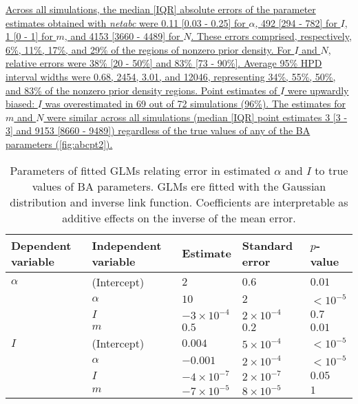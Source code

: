 \documentclass[12pt]{article}\usepackage[]{graphicx}\usepackage[]{color}
\let\mref\cref
\renewcommand{\cref}[1]{\mbox{\mref{#1}}}
\newcommand{\add}[1]{\color{blue} \uline{#1} \color{black}}
\begin{document}
\add{Across all simulations, the median [IQR] absolute errors of the parameter 
estimates obtained with \textit{netabc} were
    0.11 
    [0.03 - 
    0.25]
for $\alpha$,
    492 
    [294 - 
    782]
for $I$,
    1 
    [0 - 
    1]
for $m$, and
    4153 
    [3660 - 
    4489]
for $N$. These errors comprised, respectively,
    6\%,
    11\%,
    17\%, and
    29\%
of the regions of nonzero prior density. For $I$ and $N$, relative errors were
    38\%
    [20 - 
    50\%]
and
    83\%
    [73 - 
    90\%].
Average 95\% HPD interval widths were
    0.68,
    2454,
    3.01, and
    12046,
representing 
    34\%,
    55\%,
    50\%, and
    83\%
of the nonzero prior density regions. Point estimates of $I$ were upwardly
biased: $I$ was overestimated in
    69
out of 
    72
simulations
    (96\%).
The estimates for $m$ and $N$ were similar across all simulations (median [IQR]
point estimates
    3
    [3 - 
    3]
and 
    9153
    [8660 - 
    9489])
regardless of the true values of any of the BA parameters (\cref{fig:abcpt2}).}



\begin{table}[ht]
\centering
\begin{tabular}{lllll}
  \hline
Dependent variable & Independent variable & Estimate & Standard error & $p$-value \\ 
  \hline
$\alpha$ & (Intercept) & $2$ & $0.6$ & $0.01$ \\ 
   & $\alpha$ & $10$ & $2$ & ${<}10^{-5}$ \\ 
   & $I$ & $-3\!\times\!10^{-4}$ & $2\!\times\!10^{-4}$ & $0.7$ \\ 
   & $m$ & $0.5$ & $0.2$ & $0.01$ \\ 
  $I$ & (Intercept) & $0.004$ & $5\!\times\!10^{-4}$ & ${<}10^{-5}$ \\ 
   & $\alpha$ & $-0.001$ & $2\!\times\!10^{-4}$ & ${<}10^{-5}$ \\ 
   & $I$ & $-4\!\times\!10^{-7}$ & $2\!\times\!10^{-7}$ & $0.05$ \\ 
   & $m$ & $-7\!\times\!10^{-5}$ & $8\!\times\!10^{-5}$ & $1$ \\ 
   \hline
\end{tabular}
\caption[Parameters of fitted GLMs relating error in estimated $\alpha$ and $I$ to true values of BA parameters.]{Parameters of fitted GLMs relating error in estimated $\alpha$ and $I$ to true values of BA parameters. GLMs ere fitted with the Gaussian distribution and inverse link function. Coefficients are interpretable as additive effects on the inverse of the mean error.} 
\label{tab:glm}
\end{table}
\end{document}
